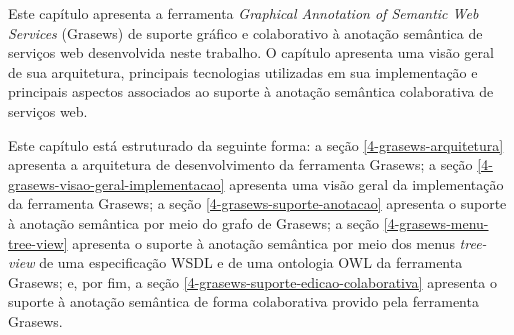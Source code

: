 Este capítulo apresenta a ferramenta \textit{Graphical Annotation of Semantic Web Services} (Grasews) de suporte gráfico e colaborativo à anotação semântica de serviços web desenvolvida neste trabalho. O capítulo apresenta uma visão geral de sua arquitetura, principais tecnologias utilizadas em sua implementação e principais aspectos associados ao suporte à anotação semântica colaborativa de serviços web.

Este capítulo está estruturado da seguinte forma: a seção \ref{4-grasews-arquitetura} apresenta a arquitetura de desenvolvimento da ferramenta Grasews; a seção \ref{4-grasews-visao-geral-implementacao} apresenta uma visão geral da implementação da ferramenta Grasews; a seção \ref{4-grasews-suporte-anotacao} apresenta o suporte à anotação semântica por meio do grafo de Grasews; a seção \ref{4-grasews-menu-tree-view} apresenta o suporte à anotação semântica por meio dos menus \textit{tree-view} de uma especificação WSDL e de uma ontologia OWL da ferramenta Grasews; e, por fim, a seção \ref{4-grasews-suporte-edicao-colaborativa} apresenta o suporte à anotação semântica de forma colaborativa provido pela ferramenta Grasews.